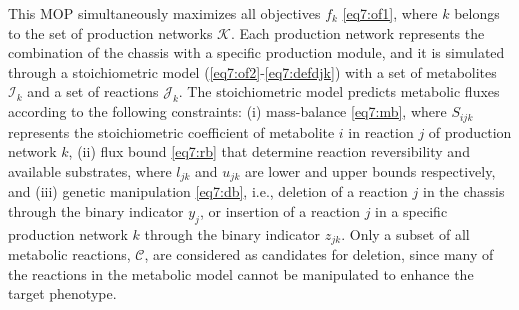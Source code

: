 \noindent This MOP simultaneously maximizes all objectives $f_k$ \eqref{eq7:of1}, where $k$ belongs to the set of production networks $\mathcal{K}$.
Each production network represents the combination of the chassis with a specific production module, and it is simulated through a stoichiometric model\citep{palsson2015} (\ref{eq7:of2}-\ref{eq7:defdjk}) with a set of metabolites $\mathcal{I}_k$ and a set of reactions $\mathcal{J}_k$.
The stoichiometric model predicts metabolic fluxes according to the following constraints:
(i) mass-balance \eqref{eq7:mb}, where $S_{ijk}$ represents the stoichiometric coefficient of metabolite $i$ in reaction $j$ of production network $k$, (ii) flux bound \eqref{eq7:rb} that determine reaction reversibility and available substrates, where $l_{jk}$ and $u_{jk}$ are lower and upper bounds respectively, and (iii) genetic manipulation \eqref{eq7:db}, i.e., deletion of a reaction $j$ in the chassis through the binary indicator $y_{j}$, or insertion of a reaction $j$ in a specific production network $k$ through the binary indicator $z_{jk}$.
Only a subset of all metabolic reactions, $\mathcal{C}$, are considered as candidates for deletion, since many of the reactions in the metabolic model cannot be manipulated to enhance the target phenotype.

